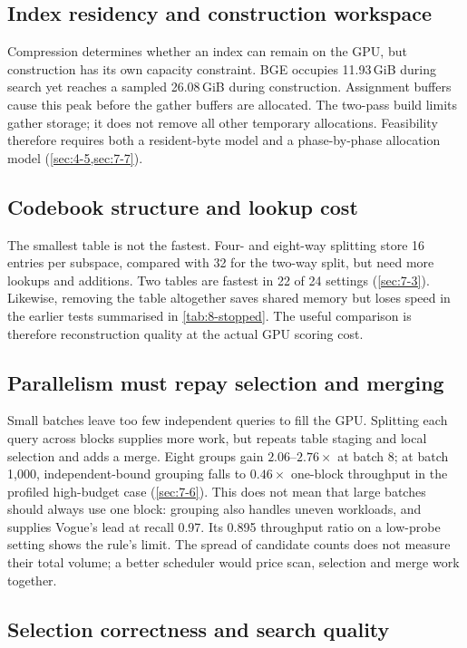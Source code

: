 \subsection{Index residency and construction workspace}

Compression determines whether an index can remain on the GPU, but
construction has its own capacity constraint. BGE occupies 11.93\,GiB
during search yet reaches a sampled 26.08\,GiB during construction.
Assignment buffers cause this peak before the gather buffers are
allocated. The two-pass build limits gather storage; it does not remove
all other temporary allocations. Feasibility therefore requires both
a resident-byte model and a phase-by-phase allocation model
(\cref{sec:4-5,sec:7-7}).

\subsection{Codebook structure and lookup cost}

The smallest table is not the fastest. Four- and eight-way splitting
store 16 entries per subspace, compared with 32 for the two-way split,
but need more lookups and additions. Two tables are fastest in 22 of
24 settings (\cref{sec:7-3}). Likewise, removing the table altogether
saves shared memory but loses speed in the earlier tests summarised in
\cref{tab:8-stopped}. The useful comparison is therefore reconstruction quality at the actual
GPU scoring cost.

\subsection{Parallelism must repay selection and merging}

Small batches leave too few independent queries to fill the GPU.
Splitting each query across blocks supplies more work, but repeats table
staging and local selection and adds a merge. Eight groups gain
$2.06$--$2.76\times$ at batch 8; at batch 1,000, independent-bound
grouping falls to $0.46\times$ one-block throughput in the profiled
high-budget case (\cref{sec:7-6}). This does not mean that large batches
should always use one block: grouping also handles uneven workloads,
and supplies Vogue's lead at recall 0.97. Its 0.895 throughput ratio on
a low-probe setting shows the rule's limit. The spread of candidate
counts does not measure their total volume; a better scheduler would
price scan, selection and merge work together.

\subsection{Selection correctness and search quality}

